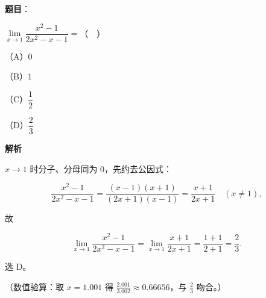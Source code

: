 \begin{answer}

\textbf{题目}：

$\lim\limits_{x\to1}\dfrac{x^2-1}{2x^2-x-1}=$（　）

（A）$0$

（B）$1$

（C）$\dfrac12$

（D）$\dfrac23$

\textbf{解析}

$x\to1$ 时分子、分母同为 $0$，先约去公因式：

\nopagebreak[4]
\[\frac{x^{2}-1}{2x^{2}-x-1}=\frac{(x-1)(x+1)}{(2x+1)(x-1)}=\frac{x+1}{2x+1}\quad(x\ne1),\]

故

\nopagebreak[4]
\[\lim_{x\to1}\frac{x^{2}-1}{2x^{2}-x-1}=\lim_{x\to1}\frac{x+1}{2x+1}=\frac{1+1}{2+1}=\frac23 .\]

选 D。

（数值验算：取 $x=1.001$ 得 $\frac{2.001}{3.002}\approx0.66656$，与 $\frac23$ 吻合。）


\end{answer}
